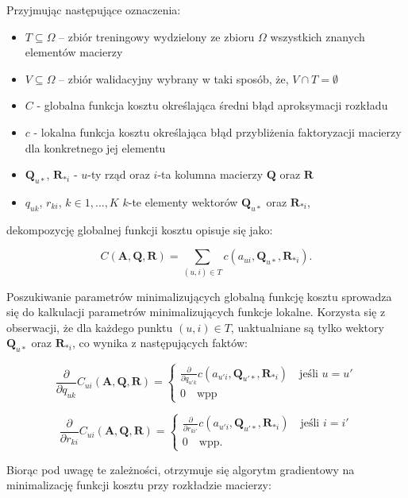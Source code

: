 \documentclass{pracamgr}
\begin{document}
Przyjmując następujące oznaczenia:
\begin{itemize} %
    \item $T \subseteq \Omega$ – zbiór treningowy wydzielony ze zbioru $\Omega$ wszystkich znanych elementów macierzy 
    \item $V \subseteq \Omega$ – zbiór walidacyjny wybrany w taki sposób, że, $V \cap T = \emptyset $
    \item $C$ - globalna funkcja kosztu określająca średni błąd aproksymacji rozkładu
    \item $c$ - lokalna funkcja kosztu określająca błąd przybliżenia faktoryzacji macierzy dla konkretnego jej elementu
    \item $\mathbf{Q}_{u \ast}$, $\mathbf{R}_{\ast i}$ - $u$-ty rząd oraz $i$-ta kolumna macierzy $\mathbf{Q}$ oraz $\mathbf{R}$
    \item $q_{uk}$, $r_{ki}$, $k \in {1, \ldots, K}$ $k$-te elementy wektorów $\mathbf{Q}_{u \ast}$ oraz $\mathbf{R}_{\ast i}$,  
\end{itemize}

dekompozycję globalnej funkcji kosztu opisuje się jako:

\[
C(\mathbf{A}, \mathbf{Q}, \mathbf{R}) = \sum_{(u,i) \in T} c(a_{ui}, \mathbf{Q}_{u \ast}, \mathbf{R}_{\ast i}).
\]

Poszukiwanie parametrów minimalizujących globalną funkcję kosztu sprowadza się do kalkulacji parametrów minimalizujących funkcje lokalne. Korzysta się z obserwacji, że dla każdego punktu $(u, i) \in T$, uaktualniane są tylko wektory $\mathbf{Q}_{u \ast}$ oraz $\mathbf{R}_{\ast i}$, co wynika z następujących faktów:

\[
\frac{\partial}{\partial q_{uk}} C_{ui}(\mathbf{A}, \mathbf{Q}, \mathbf{R}) = \begin{cases}
    \frac{\partial}{\partial q_{u'k}} c(a_{u'i}, \mathbf{Q}_{u' \ast}, \mathbf{R}_{\ast i}) \quad \text{jeśli $u = u'$} \\
    0 \quad \text{wpp}
\end{cases}
\]

\[
\frac{\partial}{\partial r_{ki}} C_{ui}(\mathbf{A}, \mathbf{Q}, \mathbf{R}) = \begin{cases}
    \frac{\partial}{\partial r_{ki'}} c(a_{u'i}, \mathbf{Q}_{u' \ast}, \mathbf{R}_{\ast i}) \quad \text{jeśli $i = i'$} \\
    0 \quad \text{wpp}.
\end{cases}
\]

Biorąc pod uwagę te zależności, otrzymuje się algorytm gradientowy na minimalizację funkcji kosztu przy rozkładzie macierzy:
\end{document}
